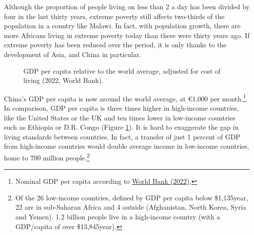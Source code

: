 \documentclass[a5paper,english,openany]{memoir}
\begin{document}
Although the proportion of people living on less than \textit{\texteuro{}}2 a day has been divided by four in the last thirty years, extreme poverty still affects two-thirds of the population in a country like Malawi. In fact, with population growth, there are more Africans living in extreme poverty today than there were thirty years ago. %
If extreme poverty has been reduced over the period, it is only thanks to the development of Asia, and China in particular. %

\begin{figure}[h!] 
  \caption[Inequalities in GDP per capita]{GDP per capita relative to the world average, adjusted for cost of living (2022, World Bank). %
  }\label{fig:GDPpc}
\end{figure}

China's GDP per capita is now around the world average, at \euro{}1,000 per month.\footnote{Nominal GDP per capita according to \href{https://data.worldbank.org/indicator/NY.GDP.PCAP.CD?end=2022&locations=CN-1W&start=2015}{World Bank (2022)}.} %
In comparison, GDP per capita is three times higher in high-income countries, like the United States or the UK %
and ten times lower in low-income countries such as Ethiopia or D.R. Congo %
(Figure \ref{fig:GDPpc}). It is hard to exaggerate the gap in living standards between countries. In fact, a transfer of just 1 percent of GDP from high-income countries %
would %
double average income in 
low-income countries, home to 700 million people.\footnote{
Of the 26 low-income countries, defined by GDP per capita %
below \$1,135\/year, 22 are in sub-Saharan Africa and 4 outside (Afghanistan, North Korea, Syria and Yemen). 1.2 billion people live in a high-income country (with a GDP/capita of over \$13,845\/year).
} %
\end{document}
